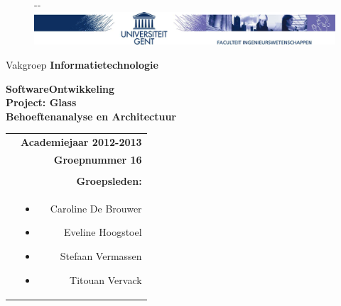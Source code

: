 \documentclass[12pt,a4paper,oneside]{article}
\begin{document}
\begin{titlepage} 
\thispagestyle{fancy}
\fancyhf{}
\begin{figure}[!ht]
  \begin{adjustwidth}{-\oddsidemargin-1in}{-\rightmargin}
    \centering
    \includegraphics[width=\paperwidth]{banner}
  \end{adjustwidth}
\end{figure}
\vspace{-0.2em}
\hfill Vakgroep \textbf{Informatietechnologie} 
\begin{center} 
\vspace{1cm} 
\Huge \textbf{SoftwareOntwikkeling \\ Project: Glass}\\ 
\vspace{4cm}
\textbf{Behoeftenanalyse en Architectuur}\\
\vspace{6.0cm}
\normalsize
\begin{tabular}{L! {} R}
& {\bf Academiejaar 2012-2013} \\
& {\bf Groepnummer 16} \\\\
& {\bf Groepsleden:}\\
& \begin{itemize}
\item Caroline De Brouwer
\item Eveline Hoogstoel
\item Stefaan Vermassen
\item Titouan Vervack
\end{itemize} \\

\end{tabular}
 
 
\end{center} 
\end{titlepage}
\end{document}
